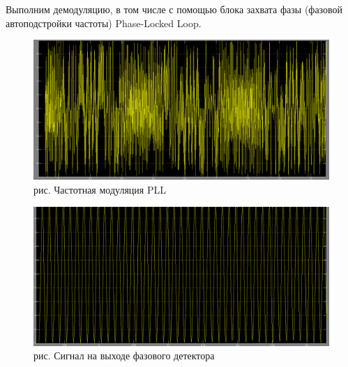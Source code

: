\documentclass[10pt,a4paper]{report}
\begin{document}
Выполним демодуляцию, в том числе с помощью блока захвата фазы (фазовой автоподстройки частоты) Phase-Locked Loop.
\begin{figure}
\begin{center}
\includegraphics[width=150mm, scale = 0.9]{8_11}\newline
рис. Частотная модуляция PLL\newline
\end{center}
\end{figure}
\begin{figure}
\begin{center}
\includegraphics[width=150mm, scale = 0.7]{8_12}\newline
рис. Сигнал на выходе фазового детектора\newline
\end{center}
\end{figure}
\end{document}
